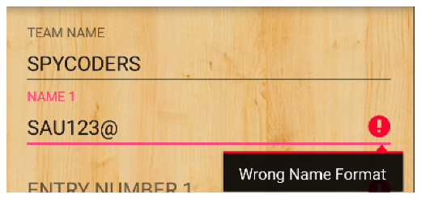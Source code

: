 \documentclass[12pt]{article}
\begin{document}
\begin{itemize}
\begin{enumerate}
            \\
            \\
            \begin{minipage}{\linewidth}
	        \centering
	        \includegraphics[scale=.7]{WRONG_NAME.png}
	

\end{minipage}
\end{enumerate}
\end{itemize}
\end{document}
